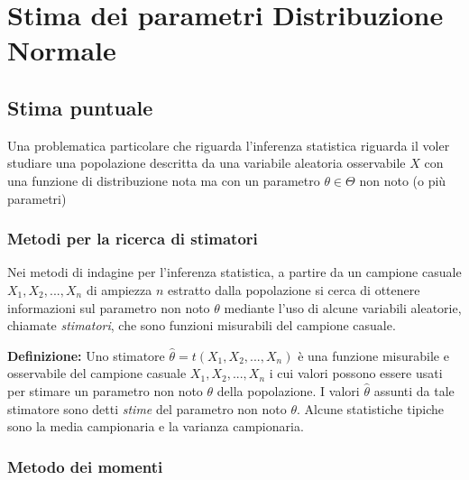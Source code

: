 {}



\chapter{Stima dei parametri Distribuzione Normale}

\section{Stima puntuale}

Una problematica particolare che riguarda l'inferenza statistica riguarda il voler studiare una popolazione descritta da una variabile aleatoria osservabile $X$ con una funzione di distribuzione nota ma con un parametro $\theta \in \Theta$ non noto (o più parametri)

\subsection{Metodi per la ricerca di stimatori}

Nei metodi di indagine per l'inferenza statistica, a partire da un campione casuale $X_1, X_2, ..., X_n$ di ampiezza $n$ estratto dalla popolazione si cerca di ottenere informazioni sul parametro non noto $\theta$ mediante l'uso di alcune variabili aleatorie, chiamate \textit{stimatori}, che sono funzioni misurabili del campione casuale.

\noindent \textbf{Definizione:} Uno stimatore $\hat{\theta} = t(X_1, X_2, ..., X_n)$ è una funzione misurabile e osservabile del campione casuale $X_1, X_2, ..., X_n$ i cui valori possono essere usati per stimare un parametro non noto $\theta$ della popolazione. I valori $\hat{\theta}$ assunti da tale stimatore sono detti \textit{stime} del parametro non noto $\theta$. Alcune statistiche tipiche sono la media campionaria e la varianza campionaria.

\subsection{Metodo dei momenti}

